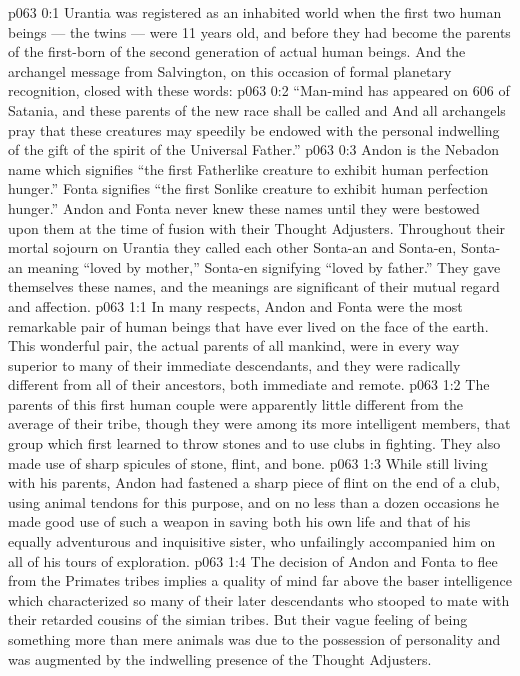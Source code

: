 \author{Life Carrier}
\vs p063 0:1 Urantia was registered as an inhabited world when the first two human beings --- the twins --- were 11 years old, and before they had become the parents of the first\hyp{}born of the second generation of actual human beings. And the archangel message from Salvington, on this occasion of formal planetary recognition, closed with these words:
\vs p063 0:2 “Man\hyp{}mind has appeared on 606 of Satania, and these parents of the new race shall be called  and  And all archangels pray that these creatures may speedily be endowed with the personal indwelling of the gift of the spirit of the Universal Father.”
\vs p063 0:3 \pc Andon is the Nebadon name which signifies “the first Fatherlike creature to exhibit human perfection hunger.” Fonta signifies “the first Sonlike creature to exhibit human perfection hunger.” Andon and Fonta never knew these names until they were bestowed upon them at the time of fusion with their Thought Adjusters. Throughout their mortal sojourn on Urantia they called each other Sonta\hyp{}an and Sonta\hyp{}en, Sonta\hyp{}an meaning “loved by mother,” Sonta\hyp{}en signifying “loved by father.” They gave themselves these names, and the meanings are significant of their mutual regard and affection.
\vs p063 1:1 In many respects, Andon and Fonta were the most remarkable pair of human beings that have ever lived on the face of the earth. This wonderful pair, the actual parents of all mankind, were in every way superior to many of their immediate descendants, and they were radically different from all of their ancestors, both immediate and remote.
\vs p063 1:2 The parents of this first human couple were apparently little different from the average of their tribe, though they were among its more intelligent members, that group which first learned to throw stones and to use clubs in fighting. They also made use of sharp spicules of stone, flint, and bone.
\vs p063 1:3 While still living with his parents, Andon had fastened a sharp piece of flint on the end of a club, using animal tendons for this purpose, and on no less than a dozen occasions he made good use of such a weapon in saving both his own life and that of his equally adventurous and inquisitive sister, who unfailingly accompanied him on all of his tours of exploration.
\vs p063 1:4 The decision of Andon and Fonta to flee from the Primates tribes implies a quality of mind far above the baser intelligence which characterized so many of their later descendants who stooped to mate with their retarded cousins of the simian tribes. But their vague feeling of being something more than mere animals was due to the possession of personality and was augmented by the indwelling presence of the Thought Adjusters.
